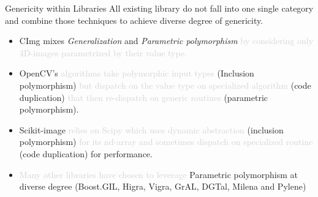 \documentclass[12pt,aspectratio=169]{beamer}
\newcommand{\GRAYOUT}[1]{\textcolor{lightgray}{#1}}%
\begin{document}
\begin{frame}[fragile]{Genericity within Libraries}
  All existing library do not fall into one single category and combine those techniques to achieve diverse degree of
  genericity.
  \vspace{-0.2cm}\small\begin{itemize}
    \item CImg mixes \emph{Generalization} and \emph{Parametric polymorphism} \GRAYOUT{by considering only 4D-images
            parametrized by their value type.}
    \item OpenCV's \GRAYOUT{algorithms take polymorphic input types} (Inclusion polymorphism) \GRAYOUT{but dispatch on
            the value type on specialized algorithm} (code duplication) \GRAYOUT{that then re-dispatch on generic
            routines} (parametric polymorphism).
    \item Scikit-image \GRAYOUT{relies on Scipy which uses dynamic abstraction} (inclusion polymorphism) \GRAYOUT{for
            its nd-array and sometimes dispatch on specialized routine} (code duplication) for performance.
    \item \GRAYOUT{Many other libraries have chosen to leverage} Parametric polymorphism at diverse degree (Boost.GIL,
          Higra, Vigra, GrAL, DGTal, Milena and Pylene)
  \end{itemize}
\end{frame}
\end{document}
